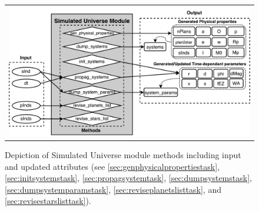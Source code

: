 \documentclass[cleanfoot]{asme2ej}
\begin{document}
\begin{figure}[ht]
    \begin{center}
        \begin{tabular}{c}
             \includegraphics[width=\textwidth]{SimulatedUniverseTasks2}
        \end{tabular}
    \end{center}
    \caption{\label{fig:simulateduniversemodule} Depiction of Simulated Universe module methods including input and updated attributes (see \ref{sec:genphysicalpropertiestask}, \ref{sec:initsystemstask}, \ref{sec:propagsystemtask}, \ref{sec:dumpsystemstask}, \ref{sec:dumpsystemparamstask}, \ref{sec:reviseplanetslisttask}, and \ref{sec:revisestarslisttask}).}
\end{figure}
\end{document}
